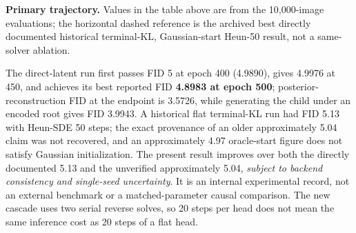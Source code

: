\documentclass[10pt]{article}
\begin{document}
\noindent\textbf{Primary trajectory.} Values in the table above are from the 10,000-image evaluations; the horizontal dashed reference is the archived best directly documented historical terminal-KL, Gaussian-start Heun-50 result, not a same-solver ablation.
\begin{center}
\end{center}
The direct-latent run first passes FID 5 at epoch 400 (4.9890), gives 4.9976 at 450, and achieves its best reported FID \textbf{4.8983 at epoch 500}; posterior-reconstruction FID at the endpoint is 3.5726, while generating the child under an encoded root gives FID 3.9943. A historical flat terminal-KL run had FID 5.13 with Heun-SDE 50 steps; the exact provenance of an older approximately 5.04 claim was not recovered, and an approximately 4.97 oracle-start figure does not satisfy Gaussian initialization. The present result improves over both the directly documented 5.13 and the unverified approximately 5.04, \emph{subject to backend consistency and single-seed uncertainty}. It is an internal experimental record, not an external benchmark or a matched-parameter causal comparison. The new cascade uses two serial reverse solves, so 20 steps per head does not mean the same inference cost as 20 steps of a flat head.
\end{document}
